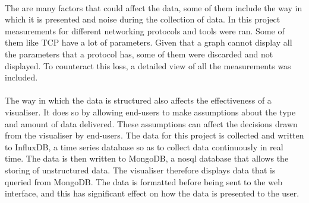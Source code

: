\paragraph{}
The are many factors that could affect the data, some of them include the way in which it is presented and noise during the collection of data. In this project measurements for different networking protocols and tools were ran. Some of them like TCP have a lot of parameters. Given that a graph cannot display all the parameters that a protocol has, some of them were discarded and not displayed. To counteract this loss, a detailed view of all the measurements was included.
\paragraph{}
The way in which the data is structured also affects the effectiveness of a visualiser. It does so by allowing end-users to make assumptions about the type and amount of data delivered. These assumptions can affect the decisions drawn from the visualiser by end-users\cite{Knight2001}. The data for this project is collected and written to InfluxDB, a time series database so as to collect data continuously in real time. The data is then written to MongoDB, a nosql database that allows the storing of unstructured data. The visualiser therefore displays data that is queried from MongoDB. The data is formatted before being sent to the web interface, and this has significant effect on how the data is presented to the user.


